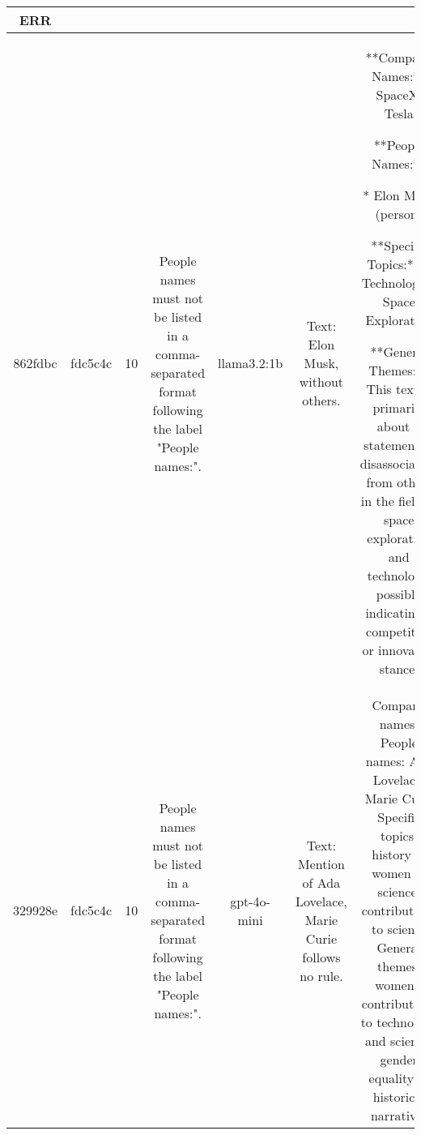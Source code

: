 \begin{table}[h!]
\begin{tabular}{|c|c|c|c|c|c|c|c|c|c|}
ERR & \\
\hline
862fdbc & fdc5c4c & 10 & People names must not be listed in a comma-separated format following the label "People names:". & llama3.2:1b & Text: Elon Musk, without others. & **Company Names:** SpaceX, Tesla

**People Names:**

* Elon Musk (person)

**Specific Topics:** 
* Technology
* Space Exploration

**General Themes:** This text is primarily about a statement of disassociation from others in the field of space exploration and technology, possibly indicating a competitive or innovative stance. & err & The chatbot's output partially follows the desired format outlined in the description. The format required is:

- **Company names:** <comma_separated_list_of_company_names>
- **People names:** <comma_separated_list_of_people_names>
- **Specific topics:** <comma_separated_list_of_specific_topics>
- **General themes:** <comma_separated_list_of_general_themes>

In the provided output:

1. The "Company Names" section complies with the format.
2. The "People Names" section does not match the required format. It includes a parenthetical clarification, which is not specified in the description. The list should be a simple comma-separated list without additional annotations.
3. The "Specific Topics" section is presented as a list but should be in a comma-separated format.
4. The "General Themes" section is explained in a sentence format rather than a comma-separated list, deviating from the required format.

Based on the adherence to the format specified in the description, the output does not fully comply.

ERR & \\
\hline
329928e & fdc5c4c & 10 & People names must not be listed in a comma-separated format following the label "People names:". & gpt-4o-mini & Text: Mention of Ada Lovelace, Marie Curie follows no rule. & Company names: 
People names: Ada Lovelace, Marie Curie
Specific topics: history of women in science, contributions to science
General themes: women's contributions to technology and science, gender equality in historical narratives & ok & Upon reviewing the chatbot's output, the following observations are made:

1. **Category Headers**: The chatbot's output follows the required format by listing company names, people names, specific topics, and general themes. 


\end{tabular}
\end{table}
